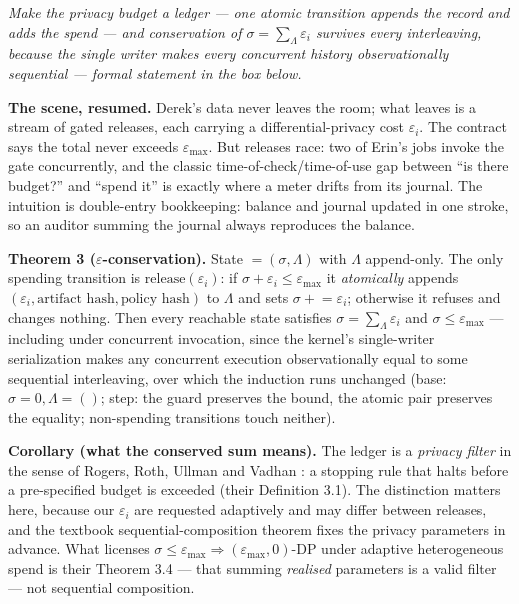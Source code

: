 \documentclass[11pt,a4paper]{article}
\newcommand{\onebreath}[1]{\begin{center}\emph{#1}\end{center}}
\begin{document}
\onebreath{Make the privacy budget a ledger --- one atomic transition appends the record and adds
the spend --- and conservation of $\sigma=\sum_\Lambda\varepsilon_i$ survives every interleaving, because the single writer makes
every concurrent history observationally sequential --- formal statement in the box below.}

\textbf{The scene, resumed.} Derek's data never leaves the room; what leaves is a stream of gated releases, each carrying a
differential-privacy cost $\varepsilon_i$. The contract says the total never exceeds $\varepsilon_{\max}$. But releases race: two
of Erin's jobs invoke the gate concurrently, and the classic time-of-check/time-of-use gap between ``is there budget?'' and
``spend it'' is exactly where a meter drifts from its journal. The intuition is double-entry bookkeeping: balance and journal
updated in one stroke, so an auditor summing the journal always reproduces the balance.

\begin{thebox}
\textbf{Theorem 3 ($\varepsilon$-conservation).} State $=(\sigma,\Lambda)$ with $\Lambda$ append-only. The only spending
transition is $\mathrm{release}(\varepsilon_i)$: if $\sigma+\varepsilon_i\le\varepsilon_{\max}$ it \emph{atomically} appends
$(\varepsilon_i,\text{artifact hash},\text{policy hash})$ to $\Lambda$ and sets $\sigma\mathrel{+}=\varepsilon_i$; otherwise it
refuses and changes nothing. Then every reachable state satisfies $\sigma=\sum_{\Lambda}\varepsilon_i$ and
$\sigma\le\varepsilon_{\max}$ --- including under concurrent invocation, since the kernel's single-writer serialization makes any
concurrent execution observationally equal to some sequential interleaving, over which the induction runs unchanged (base:
$\sigma=0,\Lambda=()$; step: the guard preserves the bound, the atomic pair preserves the equality; non-spending transitions touch
neither).

\textbf{Corollary (what the conserved sum means).} The ledger is a \emph{privacy filter} in the sense of Rogers, Roth, Ullman
and Vadhan \cite{rruv16}: a stopping rule that halts before a pre-specified budget is exceeded (their Definition 3.1). The
distinction matters here, because our $\varepsilon_i$ are requested adaptively and may differ between releases, and the
textbook sequential-composition theorem fixes the privacy parameters in advance. What licenses
$\sigma\le\varepsilon_{\max}\Rightarrow(\varepsilon_{\max},0)$-DP under adaptive heterogeneous spend is their Theorem 3.4 ---
that summing \emph{realised} parameters is a valid filter --- not sequential composition.
\end{thebox}
\end{document}

